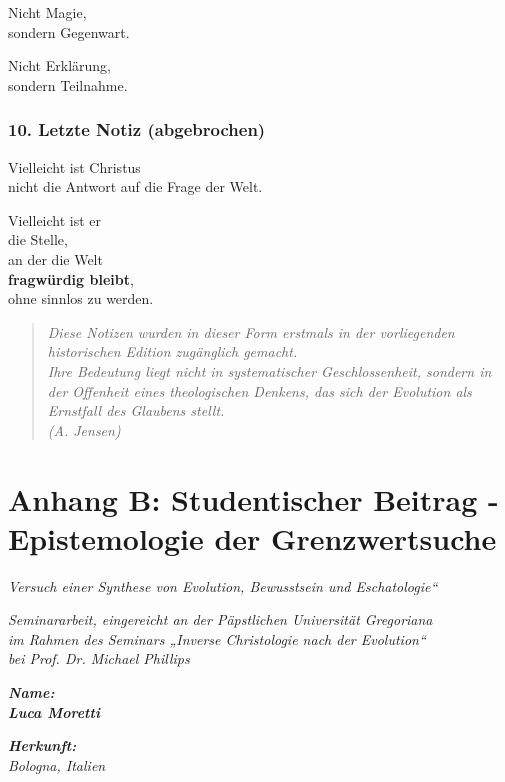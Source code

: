 \documentclass[
]{article}
\begin{document}
Nicht Magie,\\
sondern Gegenwart.

Nicht Erklärung,\\
sondern Teilnahme.

\subsubsection{\texorpdfstring{\textbf{10. Letzte Notiz (abgebrochen)}}{10. Letzte Notiz (abgebrochen)}}\label{letzte-notiz-abgebrochen}

Vielleicht ist Christus\\
nicht die Antwort auf die Frage der Welt.

Vielleicht ist er\\
die Stelle,\\
an der die Welt\\
\textbf{fragwürdig bleibt},\\
ohne sinnlos zu werden.

\begin{quote}
\emph{Diese Notizen wurden in dieser Form erstmals in der vorliegenden historischen Edition zugänglich gemacht.\\
Ihre Bedeutung liegt nicht in systematischer Geschlossenheit, sondern in der Offenheit eines theologischen Denkens, das sich der Evolution als Ernstfall des Glaubens stellt.\\
(A. Jensen)}
\end{quote}

\section{\texorpdfstring{Anhang B: \textbf{Studentischer Beitrag - Epistemologie der Grenzwertsuche} }{Anhang B: Studentischer Beitrag - Epistemologie der Grenzwertsuche }}\label{anhang-b-studentischer-beitrag---epistemologie-der-grenzwertsuche}

\emph{Versuch einer Synthese von Evolution, Bewusstsein und Eschatologie``}

\emph{Seminararbeit, eingereicht an der Päpstlichen Universität Gregoriana\\
im Rahmen des Seminars „Inverse Christologie nach der Evolution``\\
bei Prof. Dr. Michael Phillips}

\emph{\textbf{Name:\\
Luca Moretti}}

\emph{\textbf{Herkunft:\\
}Bologna, Italien}
\end{document}
